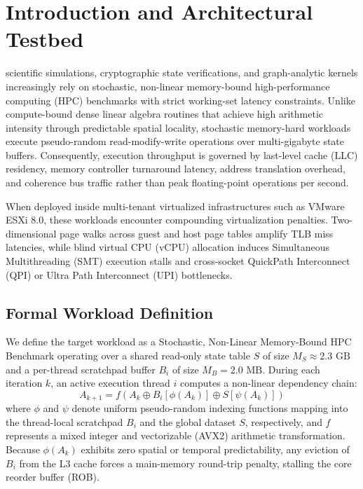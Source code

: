 \documentclass[journal]{IEEEtran}
\begin{document}
\section{Introduction and Architectural Testbed}
 scientific simulations, cryptographic state verifications, and graph-analytic kernels increasingly rely on stochastic, non-linear memory-bound high-performance computing (HPC) benchmarks with strict working-set latency constraints. Unlike compute-bound dense linear algebra routines that achieve high arithmetic intensity through predictable spatial locality, stochastic memory-hard workloads execute pseudo-random read-modify-write operations over multi-gigabyte state buffers. Consequently, execution throughput is governed by last-level cache (LLC) residency, memory controller turnaround latency, address translation overhead, and coherence bus traffic rather than peak floating-point operations per second.

When deployed inside multi-tenant virtualized infrastructures such as VMware ESXi 8.0, these workloads encounter compounding virtualization penalties. Two-dimensional page walks across guest and host page tables amplify TLB miss latencies, while blind virtual CPU (vCPU) allocation induces Simultaneous Multithreading (SMT) execution stalls and cross-socket QuickPath Interconnect (QPI) or Ultra Path Interconnect (UPI) bottlenecks.

\subsection{Formal Workload Definition}
We define the target workload as a Stochastic, Non-Linear Memory-Bound HPC Benchmark operating over a shared read-only state table $S$ of size $M_S \approx 2.3\text{ GB}$ and a per-thread scratchpad buffer $B_i$ of size $M_B = 2.0\text{ MB}$. During each iteration $k$, an active execution thread $i$ computes a non-linear dependency chain:
\begin{equation}
A_{k+1} = f\left(A_k \oplus B_i[\phi(A_k)] \oplus S[\psi(A_k)]\right)
\end{equation}
where $\phi$ and $\psi$ denote uniform pseudo-random indexing functions mapping into the thread-local scratchpad $B_i$ and the global dataset $S$, respectively, and $f$ represents a mixed integer and vectorizable (AVX2) arithmetic transformation. Because $\phi(A_k)$ exhibits zero spatial or temporal predictability, any eviction of $B_i$ from the L3 cache forces a main-memory round-trip penalty, stalling the core reorder buffer (ROB).
\end{document}

